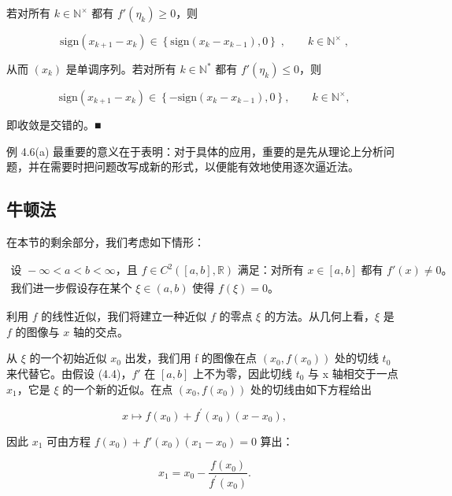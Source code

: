 \begin{example}
若对所有 $ k \in \mathbb{N}^\times $ 都有 $ f'(\eta_k) \geq 0 $，则

\[
\mathrm{s i g n}(x_{k+1}-x_{k})\in\left\{\mathrm{s i g n}(x_{k}-x_{k-1}),0\right\}\;,\qquad k\in\mathbb{N}^{\times}\;,
\]

从而 $ (x_k) $ 是单调序列。若对所有 $ k \in \mathbb{N}^* $ 都有 $ f'(\eta_k) \leq 0 $，则

\[
\mathrm{s i g n}(x_{k+1}-x_{k})\in\left\{-\mathrm{s i g n}(x_{k}-x_{k-1}),0\right\},\qquad k\in\mathbb{N}^{\times},
\]

即收敛是交错的。■

例 4.6(a) 最重要的意义在于表明：对于具体的应用，重要的是先从理论上分析问题，并在需要时把问题改写成新的形式，以便能有效地使用逐次逼近法。

\end{example}

\subsection*{牛顿法}

在本节的剩余部分，我们考虑如下情形：

\begin{equation}
\begin{aligned}
\text{设 } -\infty < a < b < \infty \text{，且 } f \in C^2([a, b], \mathbb{R}) \text{ 满足：对所有 } x \in [a, b] \text{ 都有 } f'(x) \neq 0\text{。} \\ \text{我们进一步假设存在某个 } \xi \in (a, b) \text{ 使得 } f(\xi) = 0\text{。}
\end{aligned}
\end{equation}

利用 $f$ 的线性近似，我们将建立一种近似 $f$ 的零点 $\xi$ 的方法。从几何上看，$\xi$ 是 $f$ 的图像与 $x$ 轴的交点。


从 $\xi$ 的一个初始近似 $ x_{0} $ 出发，我们用 f 的图像在点 $ (x_{0}, f(x_{0})) $ 处的切线 $ t_{0} $ 来代替它。由假设 (4.4)，$ f' $ 在 $ [a, b] $ 上不为零，因此切线 $ t_{0} $ 与 x 轴相交于一点 $ x_{1} $，它是 $\xi$ 的一个新的近似。在点 $ (x_{0}, f(x_{0})) $ 处的切线由如下方程给出

\[
x\mapsto f(x_{0})+f^{\prime}(x_{0})(x-x_{0}),
\]

因此 $ x_{1} $ 可由方程 $ f(x_{0}) + f'(x_{0})(x_{1} - x_{0}) = 0 $ 算出：

\[
x_{1}=x_{0}-\frac{f(x_{0})}{f^{\prime}(x_{0})}.
\]

